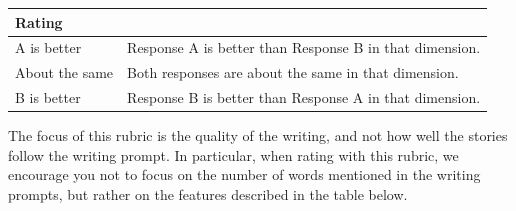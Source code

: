 \documentclass{article}
\begin{document}
\medskip
\begin{tabular}{|l|l|} \hline
\multicolumn{1}{|l|}{\textbf{Rating} } & \\\hline
A is better &
Response A is better than Response B in that dimension.\\
About the same & 
Both responses are about the same in that dimension. \\
B is better & 
Response B is better than Response A in that dimension.\\ \hline
\end{tabular}
\medskip 


The focus of this rubric is the quality of the writing, and not how well the stories follow the writing prompt. In particular, when rating with this rubric, we encourage you not to focus on the number of words mentioned in the writing prompts, but rather on the features described in the  table below. 
\medskip
\end{document}
